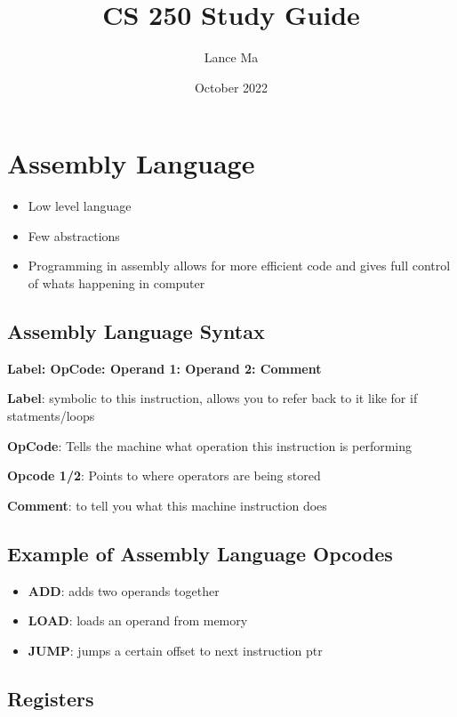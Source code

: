 \documentclass{article}
\title{CS 250 Study Guide}
\author{Lance Ma}
\date{October 2022}
\begin{document}
\maketitle

\section{Assembly Language}

\begin{itemize}
    \item Low level language
    
    \item Few abstractions
    
    \item Programming in assembly allows for more efficient code and gives full control of whats happening in computer
    

\end{itemize}


\subsection{Assembly Language Syntax}

\textbf{Label: OpCode: Operand 1: Operand 2: Comment}

\textbf{Label}: symbolic to this instruction, allows you to refer back to it like for if statments/loops

\textbf{OpCode}: Tells the machine what operation this instruction is performing

\textbf{Opcode 1/2}: Points to where operators are being stored 

\textbf{Comment}: to tell you what this machine instruction does

\subsection{Example of Assembly Language Opcodes} 
\begin{itemize}
    \item \textbf{ADD}: adds two operands together
    \item \textbf{LOAD}: loads an operand from memory
    \item \textbf{JUMP}: jumps a certain offset to next instruction ptr
    \end{itemize}

\subsection{Registers}
\end{document}
